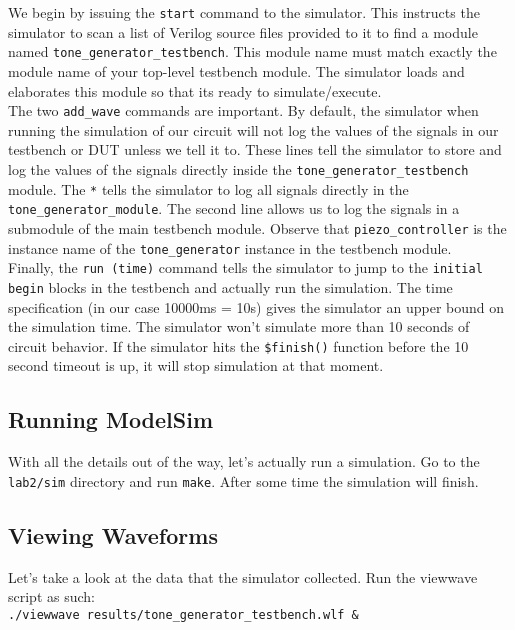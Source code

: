 \documentclass[11pt]{article}
\begin{document}
We begin by issuing the \verb|start| command to the simulator. This instructs the simulator to scan a list of Verilog source files provided to it to find a module named \verb|tone_generator_testbench|. This module name must match exactly the module name of your top-level testbench module. The simulator loads and elaborates this module so that its ready to simulate/execute.\\

The two \verb|add_wave| commands are important. By default, the simulator when running the simulation of our circuit will not log the values of the signals in our testbench or DUT unless we tell it to. These lines tell the simulator to store and log the values of the signals directly inside the \verb|tone_generator_testbench| module. The \verb|*| tells the simulator to log all signals directly in the \verb|tone_generator_module|. The second line allows us to log the signals in a submodule of the main testbench module. Observe that \verb|piezo_controller| is the instance name of the \verb|tone_generator| instance in the testbench module.\\

Finally, the \verb|run (time)| command tells the simulator to jump to the \verb|initial begin| blocks in the testbench and actually run the simulation. The time specification (in our case 10000ms = 10s) gives the simulator an upper bound on the simulation time. The simulator won't simulate more than 10 seconds of circuit behavior. If the simulator hits the \verb|$finish()| function before the 10 second timeout is up, it will stop simulation at that moment.

\subsection{Running ModelSim}

With all the details out of the way, let's actually run a simulation. Go to the \verb|lab2/sim| directory and run \verb|make|. After some time the simulation will finish.

\subsection{Viewing Waveforms}

Let's take a look at the data that the simulator collected. Run the viewwave script as such:\\

\verb|./viewwave results/tone_generator_testbench.wlf &|
\end{document}
